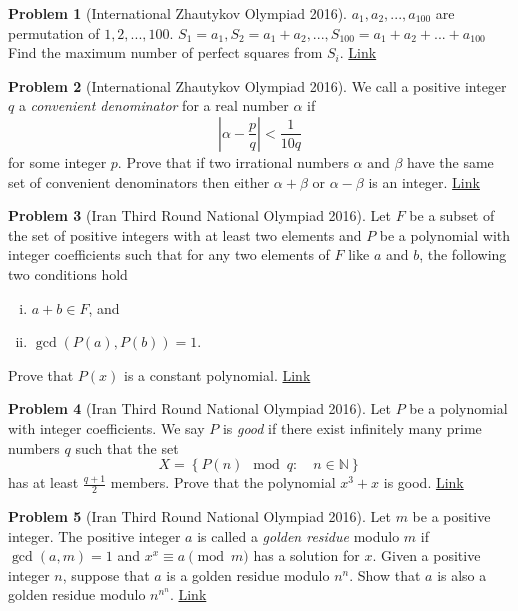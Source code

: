 \documentclass[]{article}
\theoremstyle{definition}
\newtheorem{problem}{Problem}
\begin{document}
\begin{problem}[International Zhautykov Olympiad 2016]
	$a_1,a_2,...,a_{100}$ are permutation of $1,2,...,100$. $S_1=a_1, S_2=a_1+a_2,...,S_{100}=a_1+a_2+...+a_{100}$Find the maximum number of perfect squares from $S_i$. \hfill \href{http://artofproblemsolving.com/community/c6h1185316p5756328}{Link}
\end{problem}




\begin{problem}[International Zhautykov Olympiad 2016]
	We call a positive integer $q$ a \textit{convenient denominator} for a real number $\alpha$ if
	$$\displaystyle |\alpha - \dfrac{p}{q}|<\dfrac{1}{10q}$$ for some integer $p$. Prove that if two irrational numbers $\alpha$ and
	$\beta$ have the same set of convenient denominators then either $\alpha+\beta$ or $\alpha- \beta$ is an integer. \hfill \href{http://artofproblemsolving.com/community/c6h1185684p5759537}{Link}
\end{problem}




\begin{problem}[Iran Third Round National Olympiad 2016]
	Let $F$ be a subset of the set of positive integers with at least two elements and $P$ be a polynomial with integer coefficients such that for any two elements of $F$ like $a$ and $b$, the following two conditions hold
		\begin{enumerate}[(i)]
			\item $a+b \in F$, and
			\item $\gcd(P(a),P(b))=1$.
		\end{enumerate}
	Prove that $P(x)$ is a constant polynomial. \hfill \href{http://artofproblemsolving.com/community/c6h1301958p6940711}{Link}
\end{problem}




\begin{problem}[Iran Third Round National Olympiad 2016]
	Let $P$ be a polynomial with integer coefficients. We say $P$ is \textit{good} if there exist infinitely many prime numbers $q$ such that the set $$X=\left\{P(n) \mod q : \quad n\in \mathbb N\right\}$$
	has at least $\frac{q+1}{2}$ members. Prove that the polynomial $x^3+x$ is good. \hfill \href{http://artofproblemsolving.com/community/c6h1290176p6821252}{Link}
\end{problem}




\begin{problem}[Iran Third Round National Olympiad 2016]
	Let $m$ be a positive integer. The positive integer $a$ is called a \textit{golden residue} modulo $m$ if $\gcd(a,m)=1$ and $x^x \equiv a \pmod m$ has a solution for $x$. Given a positive integer $n$, suppose that $a$ is a golden residue modulo $n^n$. Show that $a$ is also a golden residue modulo $n^{n^n}$. \hfill \href{http://artofproblemsolving.com/community/c6h1301963p6940755}{Link}
\end{problem}
\end{document}

